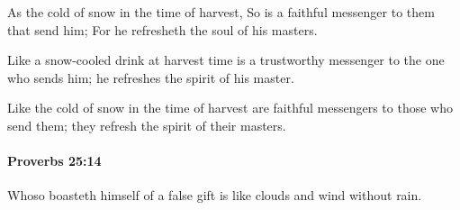 			\begin{versebox}
					\item[BHS] 
					\item[ASV] As the cold of snow in the time of harvest, So is a faithful messenger to them that send him; For he refresheth the soul of his masters.
					\item[NIV] Like a snow-cooled drink at harvest time is a trustworthy messenger to the one who sends him; he refreshes the spirit of his master.
					\item[NRSV] Like the cold of snow in the time of harvest are faithful messengers to those who send them; they refresh the spirit of their masters.
			\end{versebox}

		\paragraph{Proverbs 25:14} %
			\label{PROVERBS-25-14}

			Whoso boasteth himself of a false gift is like clouds and wind without rain.

